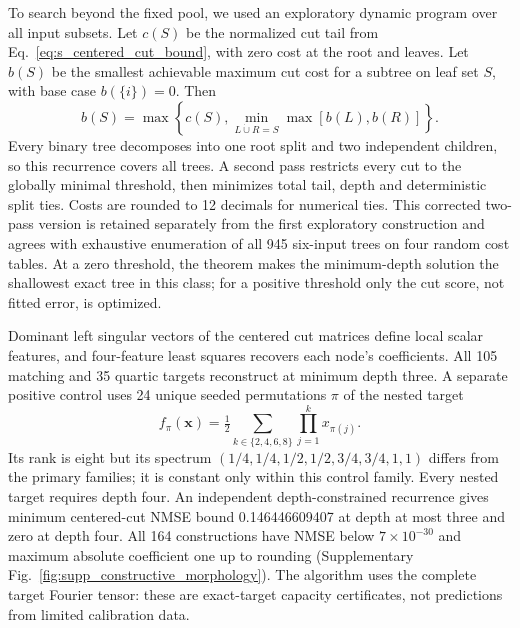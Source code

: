 To search beyond the fixed pool, we used an exploratory dynamic program
over all input subsets. Let $c(S)$ be the normalized cut tail from
Eq.~\ref{eq:s_centered_cut_bound}, with zero cost at the root and leaves.
Let $b(S)$ be the smallest achievable maximum cut cost for a subtree on
leaf set $S$, with base case $b(\{i\})=0$. Then
\begin{equation}
 b(S)=\max\left\{c(S),\min_{L\dot\cup R=S}
                            \max[b(L),b(R)]\right\}.
 \label{eq:s_tree_minimax_dp}
\end{equation}
Every binary tree decomposes into one root split and two independent
children, so this recurrence covers all trees. A second pass restricts every
cut to the globally minimal threshold, then minimizes total tail, depth and
deterministic split ties. Costs are rounded to 12 decimals for numerical
ties. This corrected two-pass version is retained separately from the first
exploratory construction and agrees with exhaustive enumeration of all 945
six-input trees on four random cost tables. At a zero threshold, the theorem
makes the minimum-depth solution the shallowest exact tree in this class;
for a positive threshold only the cut score, not fitted error, is optimized.

Dominant left singular vectors of the centered cut matrices define local
scalar features, and four-feature least squares recovers each node's
coefficients. All 105 matching and 35 quartic targets reconstruct at minimum
depth three. A separate positive control uses 24 unique seeded permutations
$\pi$ of the nested target
\begin{equation}
 f_\pi(\bm x)=\tfrac12\sum_{k\in\{2,4,6,8\}}
                         \prod_{j=1}^k x_{\pi(j)}.
\end{equation}
Its rank is eight but its spectrum
$(1/4,1/4,1/2,1/2,3/4,3/4,1,1)$ differs from the primary families; it is
constant only within this control family. Every nested target requires
depth four. An independent depth-constrained recurrence gives minimum
centered-cut NMSE bound 0.146446609407 at depth at most three and zero at
depth four. All 164 constructions have NMSE below $7\times10^{-30}$ and
maximum absolute coefficient one up to rounding
(Supplementary Fig.~\ref{fig:supp_constructive_morphology}). The algorithm
uses the complete target Fourier tensor: these are exact-target capacity
certificates, not predictions from limited calibration data.




